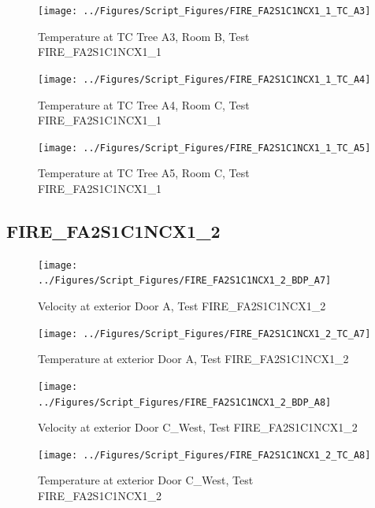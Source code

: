 \documentclass[12pt,oneside]{book}
\begin{document}
\begin{figure}[!ht]
\texttt{[image: ../Figures/Script\_Figures/FIRE\_FA2S1C1NCX1\_1\_TC\_A3]}
\caption{Temperature at TC Tree A3, Room B, Test FIRE\_FA2S1C1NCX1\_1}
\label{fig:FIRE_FA2S1C1NCX1_1_TC_A3}
\end{figure}

\begin{figure}[!ht]
\texttt{[image: ../Figures/Script\_Figures/FIRE\_FA2S1C1NCX1\_1\_TC\_A4]}
\caption{Temperature at TC Tree A4, Room C, Test FIRE\_FA2S1C1NCX1\_1}
\label{fig:FIRE_FA2S1C1NCX1_1_TC_A4}
\end{figure}

\begin{figure}[!ht]
\texttt{[image: ../Figures/Script\_Figures/FIRE\_FA2S1C1NCX1\_1\_TC\_A5]}
\caption{Temperature at TC Tree A5, Room C, Test FIRE\_FA2S1C1NCX1\_1}
\label{fig:FIRE_FA2S1C1NCX1_1_TC_A5}
\end{figure}


\clearpage


\subsection{FIRE\_FA2S1C1NCX1\_2}

\begin{figure}[!ht]
\texttt{[image: ../Figures/Script\_Figures/FIRE\_FA2S1C1NCX1\_2\_BDP\_A7]}
\caption{Velocity at exterior Door A, Test FIRE\_FA2S1C1NCX1\_2}
\label{fig:FIRE_FA2S1C1NCX1_2_BDP_A7}
\end{figure}

\begin{figure}[!ht]
\texttt{[image: ../Figures/Script\_Figures/FIRE\_FA2S1C1NCX1\_2\_TC\_A7]}
\caption{Temperature at exterior Door A, Test FIRE\_FA2S1C1NCX1\_2}
\label{fig:FIRE_FA2S1C1NCX1_2_TC_A7}
\end{figure}

\begin{figure}[!ht]
\texttt{[image: ../Figures/Script\_Figures/FIRE\_FA2S1C1NCX1\_2\_BDP\_A8]}
\caption{Velocity at exterior Door C\_West, Test FIRE\_FA2S1C1NCX1\_2}
\label{fig:FIRE_FA2S1C1NCX1_2_BDP_A8}
\end{figure}

\begin{figure}[!ht]
\texttt{[image: ../Figures/Script\_Figures/FIRE\_FA2S1C1NCX1\_2\_TC\_A8]}
\caption{Temperature at exterior Door C\_West, Test FIRE\_FA2S1C1NCX1\_2}
\label{fig:FIRE_FA2S1C1NCX1_2_TC_A8}
\end{figure}
\end{document}
